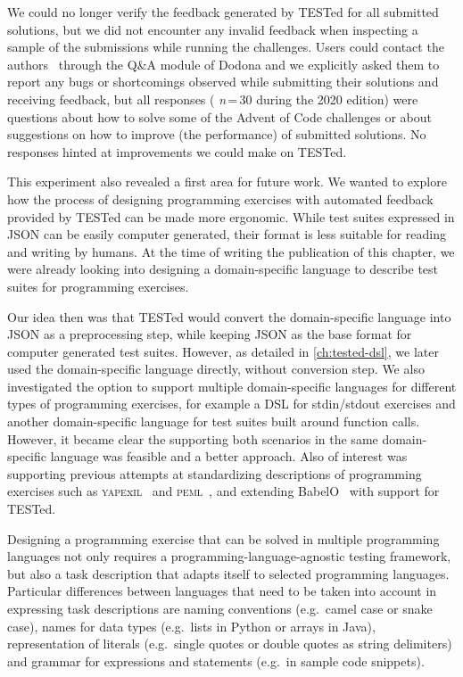 \documentclass[../main]{subfiles}
\begin{document}
We could no longer verify the feedback generated by TESTed for all submitted solutions, but we did not encounter any invalid feedback when inspecting a sample of the submissions while running the challenges.
Users could contact the authors~\autocite{strijbolTESTedEducationalTesting2023} through the Q\&A module of Dodona and we explicitly asked them to report any bugs or shortcomings observed while submitting their solutions and receiving feedback, but all responses ({ \textit{n}\,=\,30} during the 2020 edition) were questions about how to solve some of the Advent of Code challenges or about suggestions on how to improve (the performance) of submitted solutions.
No responses hinted at improvements we could make on TESTed.

This experiment also revealed a first area for future work.
We wanted to explore how the process of designing programming exercises with automated feedback provided by TESTed can be made more ergonomic.
While test suites expressed in JSON can be easily computer generated, their format is less suitable for reading and writing by humans.
At the time of writing the publication of this chapter, we were already looking into designing a domain-specific language to describe test suites for programming exercises.

Our idea then was that TESTed would convert the domain-specific language into JSON as a preprocessing step, while keeping JSON as the base format for computer generated test suites.
However, as detailed in \cref{ch:tested-dsl}, we later used the domain-specific language directly, without conversion step.
We also investigated the option to support multiple domain-specific languages for different types of programming exercises, for example a DSL for stdin/stdout exercises and another domain-specific language for test suites built around function calls.
However, it became clear the supporting both scenarios in the same domain-specific language was feasible and a better approach.
Also of interest was supporting previous attempts at standardizing descriptions of programming exercises such as \textsc{yape}x\textsc{il}~\autocite{paivaAnotherProgrammingExercises2020} and \textsc{peml}~\autocite{mishraProgrammingExerciseMarkup2023}, and extending BabelO~\autocite{queirosBabeLOExtensibleConverter2013} with support for TESTed.

Designing a programming exercise that can be solved in multiple programming languages not only requires a programming-language-agnostic testing framework, but also a task description that adapts itself to selected programming languages.
Particular differences between languages that need to be taken into account in expressing task descriptions are naming conventions (e.g.\ camel case or snake case), names for data types (e.g.\ lists in Python or arrays in Java), representation of literals (e.g.\ single quotes or double quotes as string delimiters) and grammar for expressions and statements (e.g.\ in sample code snippets).
\end{document}
